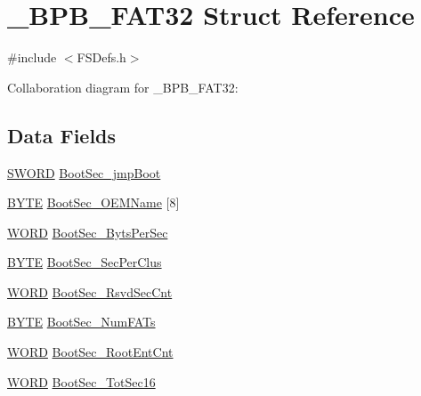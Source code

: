 \hypertarget{struct___b_p_b___f_a_t32}{}\section{\+\_\+\+B\+P\+B\+\_\+\+F\+A\+T32 Struct Reference}
\label{struct___b_p_b___f_a_t32}


{\ttfamily \#include $<$F\+S\+Defs.\+h$>$}



Collaboration diagram for \+\_\+\+B\+P\+B\+\_\+\+F\+A\+T32\+:
\subsection*{Data Fields}
\begin{DoxyCompactItemize}
\item 
\hyperlink{struct_s_w_o_r_d}{S\+W\+O\+R\+D} \hyperlink{struct___b_p_b___f_a_t32_a7bbf526732b32fa1693d51d4c29d6c32}{Boot\+Sec\+\_\+jmp\+Boot}
\item 
\hyperlink{_generic_type_defs_8h_a4ae1dab0fb4b072a66584546209e7d58}{B\+Y\+T\+E} \hyperlink{struct___b_p_b___f_a_t32_ae5fce06ddd8aa2868537d62d324fd278}{Boot\+Sec\+\_\+\+O\+E\+M\+Name} \mbox{[}8\mbox{]}
\item 
\hyperlink{_generic_type_defs_8h_a2b0e863dadf920709ec53d9088ee7c91}{W\+O\+R\+D} \hyperlink{struct___b_p_b___f_a_t32_a8847903fcf1e8ca44a91927e5a0e1716}{Boot\+Sec\+\_\+\+Byts\+Per\+Sec}
\item 
\hyperlink{_generic_type_defs_8h_a4ae1dab0fb4b072a66584546209e7d58}{B\+Y\+T\+E} \hyperlink{struct___b_p_b___f_a_t32_a7761eb3b8614f126f53b6fae721a3627}{Boot\+Sec\+\_\+\+Sec\+Per\+Clus}
\item 
\hyperlink{_generic_type_defs_8h_a2b0e863dadf920709ec53d9088ee7c91}{W\+O\+R\+D} \hyperlink{struct___b_p_b___f_a_t32_a82df916152aa95be1964f892a131ba7e}{Boot\+Sec\+\_\+\+Rsvd\+Sec\+Cnt}
\item 
\hyperlink{_generic_type_defs_8h_a4ae1dab0fb4b072a66584546209e7d58}{B\+Y\+T\+E} \hyperlink{struct___b_p_b___f_a_t32_a5daecc67984a4c674118f9b23d4222f7}{Boot\+Sec\+\_\+\+Num\+F\+A\+Ts}
\item 
\hyperlink{_generic_type_defs_8h_a2b0e863dadf920709ec53d9088ee7c91}{W\+O\+R\+D} \hyperlink{struct___b_p_b___f_a_t32_a841502908742ceb2eb7cc4b2e0b2b710}{Boot\+Sec\+\_\+\+Root\+Ent\+Cnt}
\item 
\hyperlink{_generic_type_defs_8h_a2b0e863dadf920709ec53d9088ee7c91}{W\+O\+R\+D} \hyperlink{struct___b_p_b___f_a_t32_ab2d1ff530ec98d72b60e2e78ea079e3a}{Boot\+Sec\+\_\+\+Tot\+Sec16}

\end{DoxyCompactItemize}
